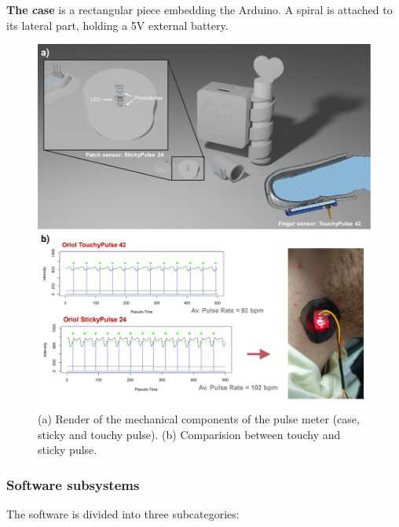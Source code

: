 \documentclass[conference]{IEEEtran}
\begin{document}
      \textbf{The case} is a rectangular piece embedding the Arduino. A spiral is attached to its lateral part, holding a 5V external battery.
      
      \begin{figure}[!b]
         \centering
         \includegraphics[width=\linewidth]{images/mechanical design.png}
         \caption{(a) Render of the mechanical components of the pulse meter (case, sticky and touchy pulse). (b) Comparision between touchy and sticky pulse.}
         \label{fig:mec}
      \end{figure}

      \subsubsection{Software subsystems}
      The software is divided into three subcategories: 
\end{document}
